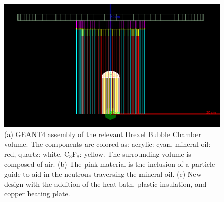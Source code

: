 \documentclass[%
12pt,
twoside,
reprint,
amsmath,amssymb,
aps,
]{article}
\begin{document}
\begin{figure}[!htb]
		\endminipage\hfill
		\includegraphics[width=\linewidth]{Images/new_design.png}
		\endminipage
		\caption{\label{tab:table-name} (a) GEANT4 assembly of the relevant Drexel Bubble Chamber volume. The components are colored as: acrylic: cyan, mineral oil: red, quartz: white, C$_{3}$F$_{8}$: yellow. The surrounding volume is composed of air. (b) The pink material is the inclusion of a particle guide to aid in the neutrons traversing the mineral oil. (c) New design with the addition of the heat bath, plastic insulation, and copper heating plate.}
	\end{figure}
	
\end{document}
